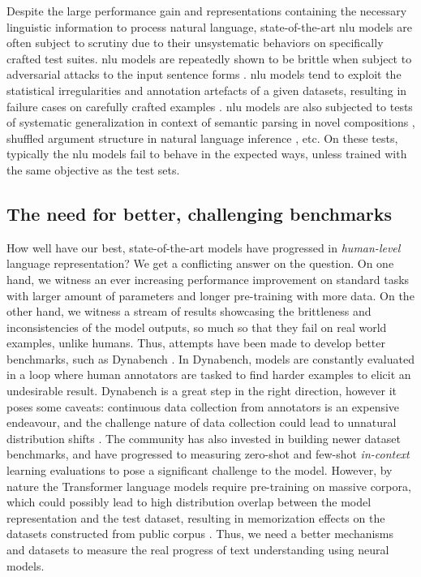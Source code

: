 \documentclass[letterpaper, 12pt]{report}
\begin{document}
Despite the large performance gain and representations containing the necessary linguistic information to process natural language, state-of-the-art \acrshort{nlu} models are often subject to scrutiny due to their unsystematic behaviors on specifically crafted test suites. \acrshort{nlu} models are repeatedly shown to be brittle when subject to adversarial attacks \cite{jia-liang-2017-adversarial,ettinger-etal-2017-towards, ettinger-2020-whatbertisnot} to the input sentence forms \cite{kaushik2018much}. \acrshort{nlu} models tend to exploit the statistical irregularities and annotation artefacts \cite{gururangan-etal-2018-annotation,poliak-etal-2018-hypothesis,tsuchiya-2018-performance} of a given datasets, resulting in failure cases on carefully crafted examples \cite{naik-etal-2018-stress,mccoy2019}.
\acrshort{nlu} models are also subjected to tests of systematic generalization in context of semantic parsing in novel compositions \cite{Lake2018:SCAN}, shuffled argument structure in natural language inference \cite{dasgupta-etal-2018-evaluating}, etc. On these tests, typically the \acrshort{nlu} models fail to behave in the expected ways, unless trained with the same objective as the test sets.

\subsection{The need for better, challenging benchmarks}

How well have our best, state-of-the-art models have progressed in \textit{human-level} language representation? We get a conflicting answer on the question. On one hand, we witness an ever increasing performance improvement on standard tasks with larger amount of parameters and longer pre-training with more data. On the other hand, we witness a stream of results showcasing the brittleness and inconsistencies of the model outputs, so much so that they fail on real world examples, unlike humans. Thus, attempts have been made to develop better benchmarks, such as Dynabench \citep{kiela-etal-2021-dynabench}. In Dynabench, models are constantly evaluated in a loop where human annotators are tasked to find harder examples to elicit an undesirable result. Dynabench is a great step in the right direction, however it poses some caveats: continuous data collection from annotators is an expensive endeavour, and the challenge nature of data collection could lead to unnatural distribution shifts \citep[Section~4, pp. 7]{kiela-etal-2021-dynabench}. The community has also invested in building newer dataset benchmarks, and have progressed to measuring zero-shot and few-shot \textit{in-context} learning evaluations to pose a significant challenge to the model. However, by nature the Transformer language models require pre-training on massive corpora, which could possibly lead to high distribution overlap between the model representation and the test dataset, resulting in memorization effects on the datasets constructed from public corpus \citep{carlini2021, carlini2022a}. Thus, we need a better mechanisms and datasets to measure the real progress of text understanding using neural models.
\end{document}
